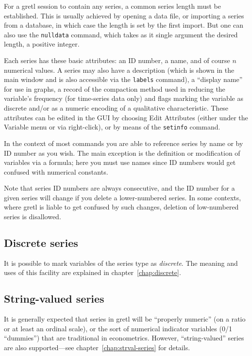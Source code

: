 For a gretl session to contain any series, a common series length must
be established. This is usually achieved by opening a data file, or
importing a series from a database, in which case the length is set by
the first import. But one can also use the \texttt{nulldata} command,
which takes as it single argument the desired length, a positive
integer.

Each series has these basic attributes: an ID number, a name, and of
course $n$ numerical values. A series may also have a description
(which is shown in the main window and is also accessible via the
\texttt{labels} command), a ``display name'' for use in graphs, a
record of the compaction method used in reducing the variable's
frequency (for time-series data only) and flags marking the variable
as discrete and/or as a numeric encoding of a qualitative
characteristic. These attributes can be edited in the GUI by choosing
\textsf{Edit Attributes} (either under the \textsf{Variable} menu or
via right-click), or by means of the \texttt{setinfo} command.

In the context of most commands you are able to reference series by
name or by ID number as you wish. The main exception is the definition
or modification of variables via a formula; here you must use names
since ID numbers would get confused with numerical constants.

Note that series ID numbers are always consecutive, and the ID number
for a given series will change if you delete a lower-numbered series.
In some contexts, where gretl is liable to get confused by such
changes, deletion of low-numbered series is disallowed.

\subsection{Discrete series}

It is possible to mark variables of the series type as
\textit{discrete}. The meaning and uses of this facility are explained
in chapter~\ref{chap:discrete}.

\subsection{String-valued series}

It is generally expected that series in gretl will be ``properly
numeric'' (on a ratio or at least an ordinal scale), or the sort of
numerical indicator variables (0/1 ``dummies'') that are traditional
in econometrics. However, ``string-valued'' series are also
supported---see chapter~\ref{chap:strval-series} for details.

